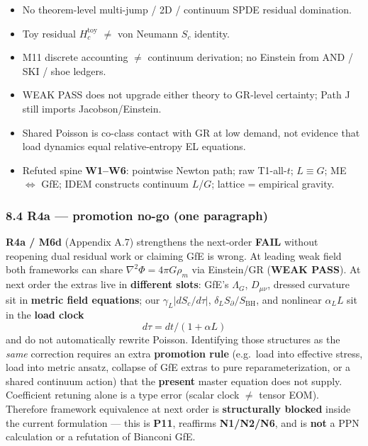 \documentclass[
  11pt,
]{article}
\providecommand{\tightlist}{%
  \setlength{\itemsep}{0pt}\setlength{\parskip}{0pt}}
\begin{document}
\begin{itemize}
\tightlist
\item
  No theorem-level multi-jump / 2D / continuum SPDE residual
  domination.\\
\item
  Toy residual \(H_c^{\mathrm{toy}}\) \(\neq\) von Neumann \(S_c\)
  identity.\\
\item
  M11 discrete accounting \(\neq\) continuum derivation; no Einstein
  from AND / SKI / shoe ledgers.\\
\item
  WEAK PASS does not upgrade either theory to GR-level certainty; Path J
  still imports Jacobson/Einstein.\\
\item
  Shared Poisson is co-class contact with GR at low demand, not evidence
  that load dynamics equal relative-entropy EL equations.\\
\item
  Refuted spine \textbf{W1--W6}: pointwise Newton path; raw
  T1-all-\(t\); \(L\equiv G\); ME \(\Leftrightarrow\) GfE; IDEM
  constructs continuum \(L\)/\(G\); lattice = empirical gravity.
\end{itemize}

\subsubsection{8.4 R4a --- promotion no-go (one
paragraph)}\label{r4a-promotion-no-go-one-paragraph}

\textbf{R4a / M6d} (Appendix A.7) strengthens the next-order
\textbf{FAIL} without reopening dual residual work or claiming GfE is
wrong. At leading weak field both frameworks can share
\(\nabla^2\Phi=4\pi G\rho_m\) via Einstein/GR (\textbf{WEAK PASS}). At
next order the extras live in \textbf{different slots}: GfE's
\(\Lambda_G\), \(D_{\mu\nu}\), dressed curvature sit in \textbf{metric
field equations}; our \(\gamma_L|dS_c/d\tau|\),
\(\delta_L S_{\partial}/S_{\mathrm{BH}}\), and nonlinear \(\alpha_L L\)
sit in the \textbf{load clock} \[d\tau=dt/(1+\alpha L)\] and do not
automatically rewrite Poisson. Identifying those structures as the
\emph{same} correction requires an extra \textbf{promotion rule}
(e.g.~load into effective stress, load into metric ansatz, collapse of
GfE extras to pure reparameterization, or a shared continuum action)
that the \textbf{present} master equation does not supply. Coefficient
retuning alone is a type error (scalar clock \(\neq\) tensor EOM).
Therefore framework equivalence at next order is \textbf{structurally
blocked} inside the current formulation --- this is \textbf{P11},
reaffirms \textbf{N1/N2/N6}, and is \textbf{not} a PPN calculation or a
refutation of Bianconi GfE.
\end{document}
